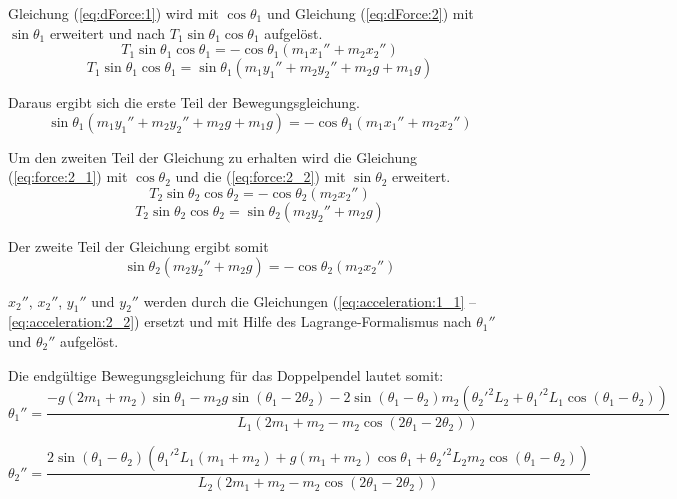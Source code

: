 \documentclass[12pt]{article}
\numberwithin{equation}{subsection}
\begin{document}
Gleichung (\ref{eq:dForce:1}) wird mit $\cos\theta_1$ und Gleichung (\ref{eq:dForce:2}) mit $\sin\theta_1$ erweitert und nach $T_1\sin\theta_1\cos\theta_1$ aufgelöst.
\begin{equation} \label{eq:thetaForce:1_1}
	T_1\sin\theta_1\cos\theta_1 = -\cos\theta_1(m_1 x_1'' + m_2 x_2'')
\end{equation}
\begin{equation} \label{eq:thetaForce:1_2}
	T_1\sin\theta_1\cos\theta_1 = \sin\theta_1(m_1 y_1'' + m_2 y_2'' + m_2 g + m_1 g)
\end{equation}

Daraus ergibt sich die erste Teil der Bewegungsgleichung.
\begin{equation} \label{eq:motion:1}
	\sin\theta_1(m_1 y_1'' + m_2 y_2'' + m_2 g + m_1 g) = -\cos\theta_1(m_1 x_1'' + m_2 x_2'')
\end{equation}

Um den zweiten Teil der Gleichung zu erhalten wird die Gleichung (\ref{eq:force:2_1}) mit $\cos\theta_2$ und die (\ref{eq:force:2_2}) mit $\sin\theta_2$ erweitert.
\begin{equation} \label{eq:thetaForce:2_1}
	T_2\sin\theta_2\cos\theta_2 = -\cos\theta_2(m_2 x_2'')
\end{equation}
\begin{equation} \label{eq:thetaForce:2_2}
	T_2\sin\theta_2\cos\theta_2 = \sin\theta_2(m_2 y_2'' + m_2 g)
\end{equation}

Der zweite Teil der Gleichung ergibt somit
\begin{equation} \label{eq:motion:2}
	\sin\theta_2(m_2 y_2'' + m_2 g) = -\cos\theta_2(m_2 x_2'')
\end{equation}

$x_2''$, $x_2''$, $y_1''$ und $y_2''$ werden durch die Gleichungen (\ref{eq:acceleration:1_1} – \ref{eq:acceleration:2_2}) ersetzt und mit Hilfe des Lagrange-Formalismus nach $\theta_1''$ und $\theta_2''$ aufgelöst.

Die endgültige Bewegungsgleichung für das Doppelpendel lautet somit:
\begin{equation} \label{eq:final:1}
	\theta_1'' = \frac{-g(2m_1+m_2)\sin\theta_1 - m_2 g \sin(\theta_1 - 2\theta_2) -2\sin(\theta_1 - \theta_2)m_2({\theta_2'}^2 L_2 + {\theta_1'}^2 L_1\cos(\theta_1 - \theta_2))}
	{L_1(2m_1 + m_2 - m_2 \cos(2\theta_1 - 2\theta_2))}
\end{equation}

\begin{equation} \label{eq:final:2}
	\theta_2'' = \frac{2\sin(\theta_1 - \theta_2)({\theta_1'}^2 L_1(m_1 + m_2) + g(m_1 + m_2)\cos\theta_1 + {\theta_2'}^2 L_2 m_2 \cos(\theta_1 - \theta_2))}
	{L_2 (2m_1 + m_2 - m_2 \cos(2 \theta_1 - 2\theta_2))}
\end{equation}
\end{document}
